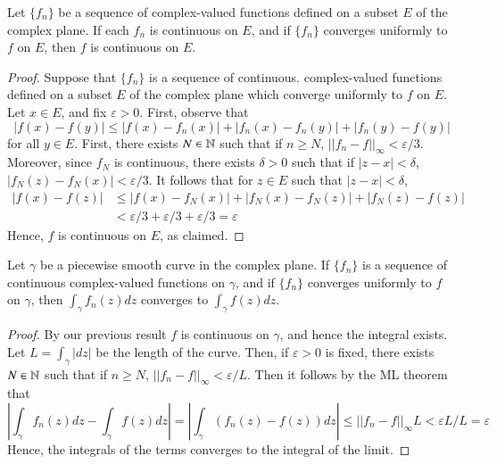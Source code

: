 \begin{theorem}
    Let $\{f_n\}$ be a sequence of complex-valued functions defined on a subset $E$ of the complex plane. If each $f_n$ is continuous on $E$, and if $\{f_n\}$ converges uniformly to $f$ on $E$, then $f$ is continuous on $E$.
\end{theorem}
\begin{proof}
    Suppose that $\{f_n\}$ is a sequence of continuous. complex-valued functions defined on a subset $E$ of the complex plane which converge uniformly to $f$ on $E$. Let $x \in E$, and fix $\varepsilon > 0$. First, observe that \begin{equation*}
        |f(x)-f(y)| \leq |f(x)-f_n(x)|+|f_n(x)-f_n(y)|+|f_n(y)-f(y)|
    \end{equation*}
    for all $y \in E$. First, there exists $N \in \mathbb N$ such that if $n \geq N$, $||f_n - f||_{\infty} < \varepsilon/3$. Moreover, since $f_N$ is continuous, there exists $\delta > 0$ such that if $|z - x| < \delta$, $|f_N(z) - f_N(x)| < \varepsilon/3$. It follows that for $z \in E$ such that $|z - x| < \delta$, \begin{align*}
        |f(x) - f(z)| &\leq |f(x) - f_N(x)| + |f_N(x)-f_N(z)| + |f_N(z) - f(z)| \\
        &< \varepsilon/3 + \varepsilon/3 + \varepsilon/3 = \varepsilon
    \end{align*}
    Hence, $f$ is continuous on $E$, as claimed.
\end{proof}


\begin{theorem}
    Let $\gamma$ be a piecewise smooth curve in the complex plane. If $\{f_n\}$ is a sequence of continuous complex-valued functions on $\gamma$, and if $\{f_n\}$ converges uniformly to $f$ on $\gamma$, then $\int_{\gamma}f_n(z)dz$ converges to $\int_{\gamma}f(z)dz$.
\end{theorem}   
\begin{proof}
    By our previous result $f$ is continuous on $\gamma$, and hence the integral exists. Let $L = \int_{\gamma}|dz|$ be the length of the curve. Then, if $\varepsilon > 0$ is fixed, there exists $N \in \mathbb N$ such that if $n \geq N$, $||f_n - f||_{\infty} <\varepsilon/L$. Then it follows by the ML theorem that \begin{equation*}
        \left|\int_{\gamma}f_n(z)dz -\int_{\gamma}f(z)dz\right| = \left|\int_{\gamma}(f_n(z)-f(z))dz\right| \leq ||f_n-f||_{\infty}L < \varepsilon L/L = \varepsilon
    \end{equation*}
    Hence, the integrals of the terms converges to the integral of the limit.
\end{proof}



